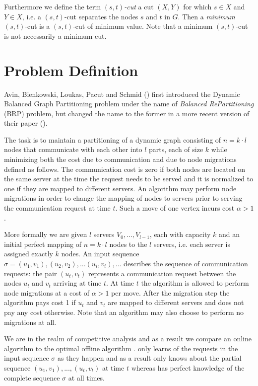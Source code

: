 \documentclass[a4paper,xcolor=dvipsnames, tikz, 12pt]{article}
\newcommand{\opt}{\text{O{\scriptsize PT}}}
\newcommand{\onl}{\text{O{\scriptsize NL}}}
\theoremstyle{definition}
\begin{document}
	Furthermore we define the term $(s,t)$\textit{-cut} a cut $(X,Y)$ for which $s\in X$ and $Y\in X$, i.e. a $(s,t)$-cut separates the nodes $s$ and $t$ in $G$. Then a \textit{minimum} $(s,t)$-cut is a $(s,t)$-cut of minimum value. Note that a minimum $(s,t)$-cut is not necessarily a minimum cut.
	
	
	\section{Problem Definition}
	
	Avin, Bienkowski, Loukas, Pacut and Schmid (\cite{Avin2016}) first introduced the Dynamic Balanced Graph Partitioning problem under the name of \textit{Balanced RePartitioning} (BRP) problem, but changed the name to the former in a more recent version of their paper (\cite{Avin2015}).
	
	The task is to maintain a partitioning of a dynamic graph consisting of $n=k\cdot l$ nodes that communicate with each other into $l$ parts, each of size $k$ while minimizing both the cost due to communication and due to node migrations defined as follows. The communication cost is zero if both nodes are located on the same server at the time the request needs to be served and it is normalized to one if they are mapped to different servers. An algorithm may perform node migrations in order to change the mapping of nodes to servers prior to serving the communication request at time $t$. Such a move of one vertex incurs cost $\alpha>1$.
	
	More formally we are given $l$ servers $V_0,...,V_{l-1}$, each with capacity $k$ and an initial perfect mapping of $n=k\cdot l$ nodes to the $l$ servers, i.e. each server is assigned exactly $k$ nodes. An input sequence $\sigma=(u_1, v_1), (u_2, v_2),...(u_i,v_i),...$ describes the sequence of communication requests: the pair $(u_t, v_t)$ represents a communication request between the nodes $u_t$ and $v_t$ arriving at time $t$. At time $t$ the algorithm is allowed to perform node migrations at a cost of $\alpha>1$ per move. After the migration step the algorithm pays cost 1 if $u_t$ and $v_t$ are mapped to different servers and does not pay any cost otherwise. Note that an algorithm may also choose to perform no migrations at all.
	
	We are in the realm of competitive analysis and as a result we compare an online algorithm \onl{} to the optimal offline algorithm \opt{}. \onl{} only learns of the requests in the input sequence $\sigma$ as they happen and as a result only knows about the partial sequence $(u_1,v_1),...,(u_t,v_t)$ at time $t$ whereas \opt{} has perfect knowledge of the complete sequence $\sigma$ at all times.
	
\end{document}
